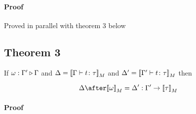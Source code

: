 \documentclass{report}
\begin{document}
    \paragraph{Proof}
    Proved in parallel with theorem 3 below
    \subsection{Theorem 3}

    If $\omega : \Gamma' \triangleright \Gamma$ and $\Delta = {\bf [\![}\Gamma \vdash t \colon \tau{\bf ]\!]}_M$ and $\Delta' = {\bf [\![}\Gamma' \vdash t \colon \tau{\bf ]\!]}_M$ then 

    $$
        \D \after \deno{\w} = \D' : \G' \rightarrow \deno{\tau}
    $$
    \paragraph{Proof}
\end{document}
